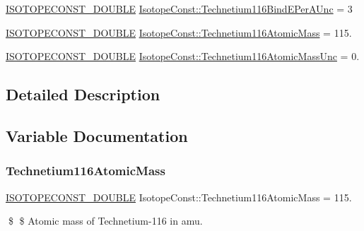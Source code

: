 \begin{DoxyCompactItemize}
\mbox{\hyperlink{group___isotope_const-_macros_ga8f45a7272ce02c0b4c65c44636ed719a}{I\+S\+O\+T\+O\+P\+E\+C\+O\+N\+S\+T\+\_\+\+D\+O\+U\+B\+LE}} \mbox{\hyperlink{group___isotope_const-_technetium-_tc116_gafeeb2548cef4c8517c80b63dad467e97}{Isotope\+Const\+::\+Technetium116\+Bind\+E\+Per\+A\+Unc}} = 3
\item 
\mbox{\hyperlink{group___isotope_const-_macros_ga8f45a7272ce02c0b4c65c44636ed719a}{I\+S\+O\+T\+O\+P\+E\+C\+O\+N\+S\+T\+\_\+\+D\+O\+U\+B\+LE}} \mbox{\hyperlink{group___isotope_const-_technetium-_tc116_ga1075c200221c3a09d91f4c59fe4d38f2}{Isotope\+Const\+::\+Technetium116\+Atomic\+Mass}} = 115.
\item 
\mbox{\hyperlink{group___isotope_const-_macros_ga8f45a7272ce02c0b4c65c44636ed719a}{I\+S\+O\+T\+O\+P\+E\+C\+O\+N\+S\+T\+\_\+\+D\+O\+U\+B\+LE}} \mbox{\hyperlink{group___isotope_const-_technetium-_tc116_gadaef638c2d16c6aad112535f23ede96d}{Isotope\+Const\+::\+Technetium116\+Atomic\+Mass\+Unc}} = 0.
\end{DoxyCompactItemize}


\subsection{Detailed Description}


\subsection{Variable Documentation}
\mbox{\label{group___isotope_const-_technetium-_tc116_ga1075c200221c3a09d91f4c59fe4d38f2}} 
\subsubsection{\texorpdfstring{Technetium116\+Atomic\+Mass}{Technetium116AtomicMass}}
{\footnotesize\ttfamily \mbox{\hyperlink{group___isotope_const-_macros_ga8f45a7272ce02c0b4c65c44636ed719a}{I\+S\+O\+T\+O\+P\+E\+C\+O\+N\+S\+T\+\_\+\+D\+O\+U\+B\+LE}} Isotope\+Const\+::\+Technetium116\+Atomic\+Mass = 115.}

\$ \$ Atomic mass of Technetium-\/116 in amu. \mbox{\label{group___isotope_const-_technetium-_tc116_gadaef638c2d16c6aad112535f23ede96d}} 
